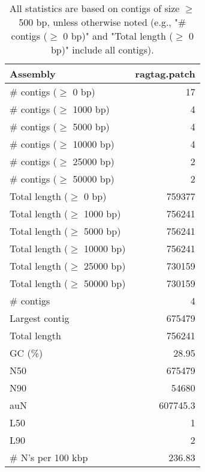 \documentclass[12pt,a4paper]{article}
\begin{document}
\begin{table}[ht]
\begin{center}
\caption{All statistics are based on contigs of size $\geq$ 500 bp, unless otherwise noted (e.g., "\# contigs ($\geq$ 0 bp)" and "Total length ($\geq$ 0 bp)" include all contigs).}
\begin{tabular}{|l*{1}{|r}|}
\hline
Assembly & ragtag.patch \\ \hline
\# contigs ($\geq$ 0 bp) & 17 \\ \hline
\# contigs ($\geq$ 1000 bp) & 4 \\ \hline
\# contigs ($\geq$ 5000 bp) & 4 \\ \hline
\# contigs ($\geq$ 10000 bp) & 4 \\ \hline
\# contigs ($\geq$ 25000 bp) & 2 \\ \hline
\# contigs ($\geq$ 50000 bp) & 2 \\ \hline
Total length ($\geq$ 0 bp) & 759377 \\ \hline
Total length ($\geq$ 1000 bp) & 756241 \\ \hline
Total length ($\geq$ 5000 bp) & 756241 \\ \hline
Total length ($\geq$ 10000 bp) & 756241 \\ \hline
Total length ($\geq$ 25000 bp) & 730159 \\ \hline
Total length ($\geq$ 50000 bp) & 730159 \\ \hline
\# contigs & 4 \\ \hline
Largest contig & 675479 \\ \hline
Total length & 756241 \\ \hline
GC (\%) & 28.95 \\ \hline
N50 & 675479 \\ \hline
N90 & 54680 \\ \hline
auN & 607745.3 \\ \hline
L50 & 1 \\ \hline
L90 & 2 \\ \hline
\# N's per 100 kbp & 236.83 \\ \hline
\end{tabular}
\end{center}
\end{table}
\end{document}
